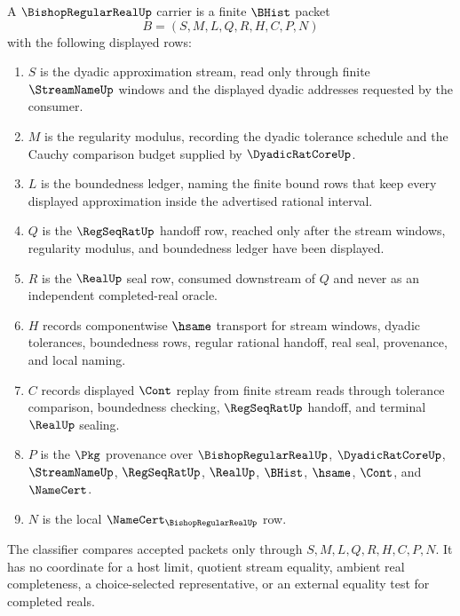 \begin{definition}
\label{def:bounded-cauchy-modulus-real-carrier}
A $\BishopRegularRealUp$ carrier is a finite $\BHist$ packet
$$
B=(S,M,L,Q,R,H,C,P,N)
$$
with the following displayed rows:
\begin{enumerate}
\item $S$ is the dyadic approximation stream, read only through finite $\StreamNameUp$ windows and the displayed dyadic addresses requested by the consumer.
\item $M$ is the regularity modulus, recording the dyadic tolerance schedule and the Cauchy comparison budget supplied by $\DyadicRatCoreUp$.
\item $L$ is the boundedness ledger, naming the finite bound rows that keep every displayed approximation inside the advertised rational interval.
\item $Q$ is the $\RegSeqRatUp$ handoff row, reached only after the stream windows, regularity modulus, and boundedness ledger have been displayed.
\item $R$ is the $\RealUp$ seal row, consumed downstream of $Q$ and never as an independent completed-real oracle.
\item $H$ records componentwise $\hsame$ transport for stream windows, dyadic tolerances, boundedness rows, regular rational handoff, real seal, provenance, and local naming.
\item $C$ records displayed $\Cont$ replay from finite stream reads through tolerance comparison, boundedness checking, $\RegSeqRatUp$ handoff, and terminal $\RealUp$ sealing.
\item $P$ is the $\Pkg$ provenance over $\BishopRegularRealUp$, $\DyadicRatCoreUp$, $\StreamNameUp$, $\RegSeqRatUp$, $\RealUp$, $\BHist$, $\hsame$, $\Cont$, and $\NameCert$.
\item $N$ is the local $\NameCert_{\BishopRegularRealUp}$ row.
\end{enumerate}
The classifier compares accepted packets only through $S,M,L,Q,R,H,C,P,N$. It has no coordinate for a host limit, quotient stream equality, ambient real completeness, a choice-selected representative, or an external equality test for completed reals.
\end{definition}

